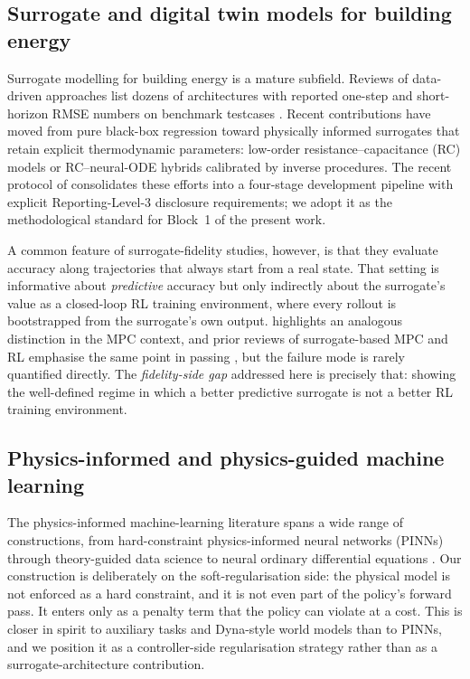 \subsection{Surrogate and digital twin models for building energy}
\label{ssec:rw_surrogate}

Surrogate modelling for building energy is a mature subfield. Reviews
of data-driven approaches list dozens of architectures with reported
one-step and short-horizon RMSE numbers on benchmark testcases
\citep{Amasyali2018Review}. Recent contributions have moved from pure
black-box regression toward physically informed surrogates that retain
explicit thermodynamic parameters: low-order resistance--capacitance
(RC) models \citep{Bacher2011RCIdentification,Berthou2014RC,Bunning2020RC}
or RC--neural-ODE hybrids \citep{Chen2018NeuralODE,Chen2022PhysicalTwin}
calibrated by inverse procedures. The recent
protocol of \cite{HouEvins2024} consolidates these efforts into a
four-stage development pipeline with explicit Reporting-Level-3
disclosure requirements; we adopt it as the methodological standard
for Block~1 of the present work.

A common feature of surrogate-fidelity studies, however, is that they
evaluate accuracy along trajectories that always start from a real
state. That setting is informative about \emph{predictive} accuracy
but only indirectly about the surrogate's value as a closed-loop RL
training environment, where every rollout is bootstrapped from the
surrogate's own output. \cite{Picard2017WhiteBox} highlights an
analogous distinction in the MPC context, and prior reviews of
surrogate-based MPC and RL emphasise the same point in passing
\citep{Mason2019RLReview,Drgona2020StochasticMPC}, but the failure mode
is rarely quantified directly. The \emph{fidelity-side gap} addressed
here is precisely that: showing the well-defined regime in which a
better predictive surrogate is not a better RL training environment.

\subsection{Physics-informed and physics-guided machine learning}
\label{ssec:rw_pinn}

The physics-informed machine-learning literature spans a wide range of
constructions, from hard-constraint physics-informed neural networks
(PINNs) \citep{Raissi2019PINN} through theory-guided data science
\citep{Karpatne2017TheoryGuided,Willard2022PIML} to neural ordinary
differential equations \citep{Chen2018NeuralODE}. Our construction is
deliberately on the soft-regularisation side: the physical model is
not enforced as a hard constraint, and it is not even part of the
policy's forward pass. It enters only as a penalty term that the
policy can violate at a cost. This is closer in spirit to auxiliary
tasks \citep{Jaderberg2017UNREAL} and Dyna-style world models
\citep{Sutton1991Dyna,Hafner2025Dreamer} than to PINNs, and we
position it as a controller-side regularisation strategy rather than
as a surrogate-architecture contribution.

